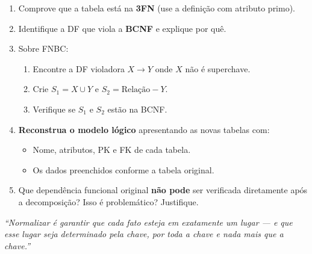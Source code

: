 \documentclass[12pt]{article}
\begin{document}
\begin{enumerate}[label=\textbf{Questão \arabic*:}, leftmargin=*]
  \begin{enumerate}[label=\alph*)]
    \item Comprove que a tabela está na \textbf{3FN} (use a definição com atributo primo).
    \item Identifique a DF que viola a \textbf{BCNF} e explique por quê.
    \item Sobre FNBC:
    \begin{enumerate}[label=\roman*.]
      \item Encontre a DF violadora $X \to Y$ onde $X$ não é superchave.
      \item Crie $S_1 = X \cup Y$ e $S_2 = \text{Relação} - Y$.
      \item Verifique se $S_1$ e $S_2$ estão na BCNF.
    \end{enumerate}
    \item \textbf{Reconstrua o modelo lógico} apresentando as novas tabelas com:
    \begin{itemize}
      \item Nome, atributos, PK e FK de cada tabela.
      \item Os dados preenchidos conforme a tabela original.
    \end{itemize}
    \item Que dependência funcional original \textbf{não pode} ser verificada diretamente após a decomposição? Isso é problemático? Justifique.
  \end{enumerate}

\end{enumerate}

\vspace{1cm}
\begin{center}
  \textit{``Normalizar é garantir que cada fato esteja em exatamente um lugar --- e que esse lugar seja determinado pela chave, por toda a chave e nada mais que a chave.''}
\end{center}
\end{document}
